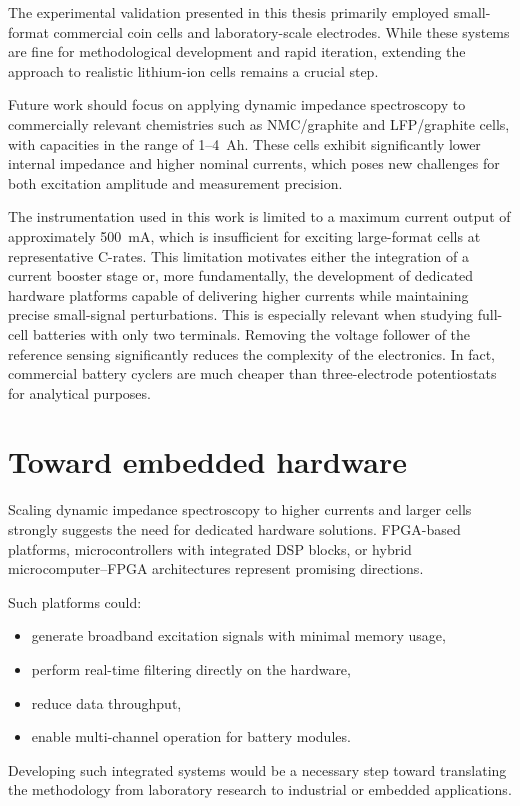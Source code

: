 The experimental validation presented in this thesis primarily employed small-format commercial coin cells and laboratory-scale electrodes. While these systems are fine for methodological development and rapid iteration, extending the approach to realistic lithium-ion cells remains a crucial step.

Future work should focus on applying dynamic impedance spectroscopy to commercially relevant chemistries such as NMC/graphite and LFP/graphite cells, with capacities in the range of 1--4~Ah. These cells exhibit significantly lower internal impedance and higher nominal currents, which poses new challenges for both excitation amplitude and measurement precision.

The instrumentation used in this work is limited to a maximum current output of approximately 500~mA, which is insufficient for exciting large-format cells at representative C-rates. This limitation motivates either the integration of a current booster stage or, more fundamentally, the development of dedicated hardware platforms capable of delivering higher currents while maintaining precise small-signal perturbations.
This is especially relevant when studying full-cell batteries with only two terminals. Removing the voltage follower of the reference sensing significantly reduces the complexity of the electronics.
In fact, commercial battery cyclers are much cheaper than three-electrode potentiostats for analytical purposes.

\section{Toward embedded hardware}

Scaling dynamic impedance spectroscopy to higher currents and larger cells strongly suggests the need for dedicated hardware solutions. FPGA-based platforms, microcontrollers with integrated DSP blocks, or hybrid microcomputer--FPGA architectures represent promising directions.

Such platforms could:
\begin{itemize}
    \item generate broadband excitation signals with minimal memory usage,
    \item perform real-time filtering directly on the hardware,
    \item reduce data throughput,
    \item enable multi-channel operation for battery modules.
\end{itemize}
Developing such integrated systems would be a necessary step toward translating the methodology from laboratory research to industrial or embedded applications.

